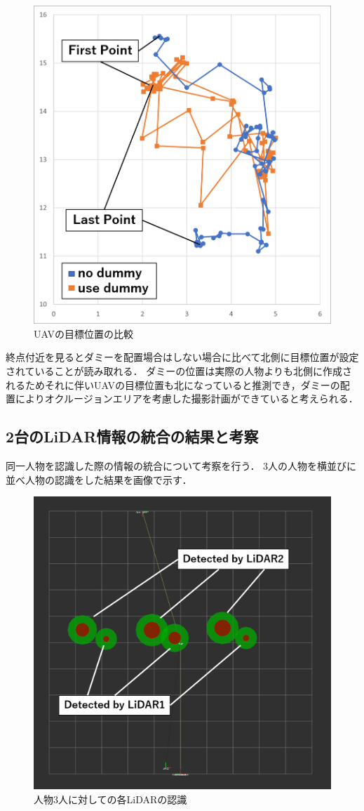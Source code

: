 \documentclass[autodetect-engine,dvipdfmx-if-dvi,ja=standard,a4j,jbase=10.5pt,twoside,twocolumn,magstyle=nomag*]{bxjsarticle}
\begin{document}
\begin{figure}[h]
    \centering
    \includegraphics[width=0.7\linewidth, clip]{./figure/goal_graph.png}
    \caption{UAVの目標位置の比較}
    \label{fig:system}
\end{figure}

終点付近を見るとダミーを配置場合はしない場合に比べて北側に目標位置が設定されていることが読み取れる．
ダミーの位置は実際の人物よりも北側に作成されるためそれに伴いUAVの目標位置も北になっていると推測でき，ダミーの配置によりオクルージョンエリアを考慮した撮影計画ができていると考えられる．

\subsection{2台のLiDAR情報の統合の結果と考察}
同一人物を認識した際の情報の統合について考察を行う．
3人の人物を横並びに並べ人物の認識をした結果を画像で示す．

\begin{figure}[h]
    \centering
    \includegraphics[width=0.7\linewidth, clip]{./figure/row.png}
    \caption{人物3人に対しての各LiDARの認識}
    \label{fig:row}
\end{figure}
\end{document}
